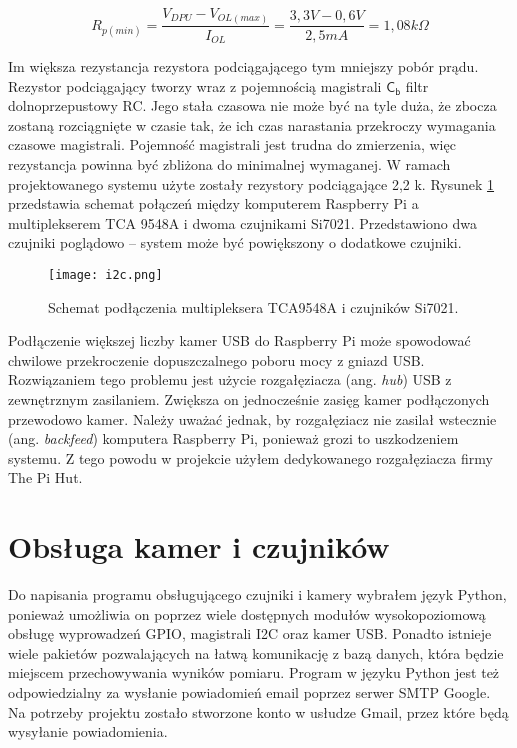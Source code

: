 \documentclass[a4paper,11pt,twoside]{article}
\begin{document}
\begin{equation} \label{pullup}
R_{p(min)} = \frac{V_{DPU} - V_{OL(max)}}{I_{OL}} = \frac{3,3 V - 0,6 V}{2,5 mA} = 1,08 k\Omega  
\end{equation} 

Im większa rezystancja rezystora podciągającego tym mniejszy pobór prądu. Rezystor podciągający tworzy wraz z pojemnością magistrali $\mathsf{C_{b}}$ filtr dolnoprzepustowy RC. Jego stała czasowa nie może być na tyle duża, że zbocza zostaną rozciągnięte w czasie tak, że ich czas narastania przekroczy wymagania czasowe magistrali. Pojemność magistrali jest trudna do zmierzenia, więc rezystancja powinna być zbliżona do minimalnej wymaganej. W ramach projektowanego systemu użyte zostały rezystory podciągające 2,2 k\textOmega. Rysunek \ref{fig: i2c_schemat} przedstawia schemat połączeń między komputerem Raspberry Pi a multiplekserem TCA 9548A i dwoma czujnikami Si7021. Przedstawiono dwa czujniki poglądowo -- system może być powiększony o dodatkowe czujniki.

\begin{figure}[h]
\texttt{[image: i2c.png]}
\caption{Schemat podłączenia multipleksera TCA9548A i czujników Si7021.}
\label{fig: i2c_schemat}
\end{figure}

Podłączenie większej liczby kamer USB do Raspberry Pi może spowodować chwilowe przekroczenie dopuszczalnego poboru mocy z gniazd USB. Rozwiązaniem tego problemu jest użycie rozgałęziacza (ang. \textit{hub}) USB z zewnętrznym zasilaniem. Zwiększa on jednocześnie zasięg kamer podłączonych przewodowo kamer. Należy uważać jednak, by rozgałęziacz nie zasilał wstecznie (ang. \textit{backfeed}) komputera Raspberry Pi, ponieważ grozi to uszkodzeniem systemu. Z tego powodu w projekcie użyłem dedykowanego rozgałęziacza firmy The Pi Hut.

\newpage
\section{Obsługa kamer i czujników}
Do napisania programu obsługującego czujniki i kamery wybrałem język Python, ponieważ umożliwia on poprzez wiele dostępnych modułów wysokopoziomową obsługę wyprowadzeń GPIO, magistrali I2C oraz kamer USB. Ponadto istnieje wiele pakietów pozwalających na łatwą komunikację z bazą danych, która będzie miejscem przechowywania wyników pomiaru. Program w języku Python jest też odpowiedzialny za wysłanie powiadomień email poprzez serwer SMTP Google. Na potrzeby projektu zostało stworzone konto w usłudze Gmail, przez które będą wysyłanie powiadomienia. 
\end{document}
